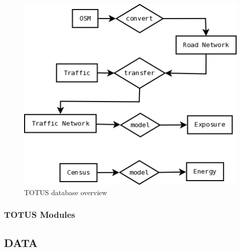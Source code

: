 \begin{figure}
	\caption{TOTUS database overview}
	\label{fig:db_diag}
	\includegraphics[width = 12cm]{system_data.png}
\end{figure}

\subsubsection*{TOTUS Modules}

\subsection*{DATA}

